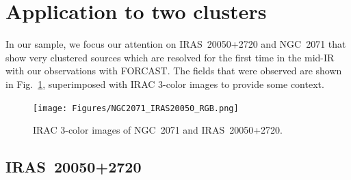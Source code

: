 \section{Application to two clusters}

In our sample, we focus our attention on IRAS~20050+2720 and NGC~2071 that show very clustered sources which are resolved for the first time in the mid-IR with our observations with FORCAST. The fields that were observed are shown in Fig.~\ref{fig:NGC2071_IRAS20050_RGB}, superimposed with IRAC 3-color images to provide some context.

\begin{landscape}
\begin{figure}
\begin{center}
\texttt{[image: Figures/NGC2071\_IRAS20050\_RGB.png]}

\caption[NGC~2071 and IRAS~20050+2720]{IRAC 3-color images of NGC~2071 and IRAS~20050+2720.}
\label{fig:NGC2071_IRAS20050_RGB}
\end{center}
\end{figure}
\end{landscape}




\subsection{IRAS~20050+2720}
\label{sec:IRAS}

